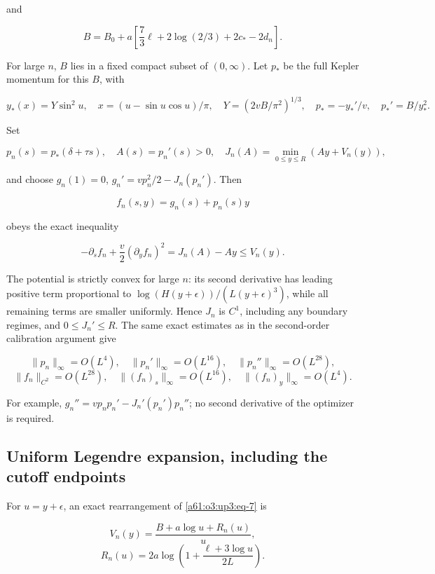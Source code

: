 \documentclass[11pt,letterpaper]{article}
\numberwithin{equation}{section}
\theoremstyle{remark}\newtheorem{remark}[theorem]{Remark}
\begin{document}
and

\begin{equation}
B=B_0+a\left[\frac73\ell+2\log(2/3)+2c_*-2d_n\right].
\label{a61:o3:up3:eq-8}
\end{equation}

For large \(n\), \(B\) lies in a fixed compact subset of \((0,\infty)\).
Let \(p_*\) be the full Kepler momentum for this \(B\), with

\[
y_*(x)=Y\sin^2 u,\quad x=(u-\sin u\cos u)/\pi,\quad
Y=(2vB/\pi^2)^{1/3},\quad
p_*=-y_*'/v,\quad p_*'=B/y_*^2.
\]

Set

\[
p_n(s)=p_*(\delta+\tau s),\quad A(s)=p_n'(s)>0,\quad
J_n(A)=\min_{0\le y\le R}(Ay+V_n(y)),
\]

and choose \(g_n(1)=0\), \(g_n'=vp_n^2/2-J_n(p_n')\). Then

\[
f_n(s,y)=g_n(s)+p_n(s)y
\]

obeys the exact inequality

\begin{equation}
-\partial_sf_n+\frac v2(\partial_yf_n)^2
 =J_n(A)-Ay\le V_n(y).
\label{a61:o3:up3:eq-9}
\end{equation}

The potential is strictly convex for large \(n\): its second derivative
has leading positive term proportional to
\(\log(H(y+\epsilon))/(L(y+\epsilon)^3)\), while all remaining terms are
smaller uniformly. Hence \(J_n\) is \(C^1\), including any boundary
regimes, and \(0\le J_n'\le R\). The same exact estimates as in the
second-order calibration argument give

\[
\|p_n\|_\infty=O(L^4),\quad
\|p_n'\|_\infty=O(L^{16}),\quad
\|p_n''\|_\infty=O(L^{28}),
\] \begin{equation}
\|f_n\|_{C^2}=O(L^{28}),\quad
\|(f_n)_s\|_\infty=O(L^{16}),\quad
\|(f_n)_y\|_\infty=O(L^4).
\label{a61:o3:up3:eq-10}
\end{equation}

For example, \(g_n''=vp_np_n'-J_n'(p_n')p_n''\); no second derivative of
the optimizer is required.

\subsection{Uniform Legendre expansion, including the cutoff endpoints}

For \(u=y+\epsilon\), an exact rearrangement of \eqref{a61:o3:up3:eq-7} is

\[
V_n(y)=\frac{B+a\log u+R_n(u)}u,
\] \begin{equation}
R_n(u)=2a\log\left(1+\frac{\ell+3\log u}{2L}\right).
\label{a61:o3:up3:eq-11}
\end{equation}
\end{document}
